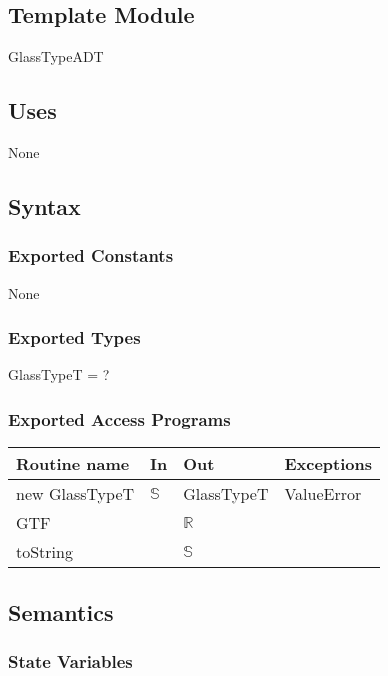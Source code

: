 \documentclass[12pt, titlepage]{article}
\begin{document}
\subsection{Template Module}

GlassTypeADT

\subsection {Uses}

None

\subsection {Syntax}

\subsubsection {Exported Constants}

None

\subsubsection {Exported Types}

GlassTypeT = ?

\subsubsection {Exported Access Programs}

\begin{tabular}{| l | l | l | p{5cm} |}
\hline
\textbf{Routine name} & \textbf{In} & \textbf{Out} & \textbf{Exceptions}\\
\hline
new GlassTypeT & $\mathbb{S}$ & GlassTypeT & ValueError\\
\hline
GTF & ~ & $\mathbb{R}$ & ~\\
\hline
toString & ~ & $\mathbb{S}$ & ~\\
\hline
\end{tabular}

\subsection {Semantics}

\subsubsection {State Variables}
\end{document}
